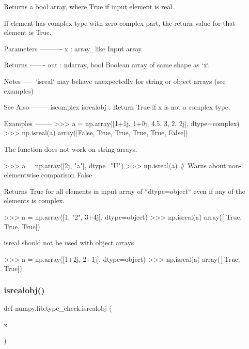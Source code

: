 \begin{DoxyVerb}Returns a bool array, where True if input element is real.

If element has complex type with zero complex part, the return value
for that element is True.

Parameters
----------
x : array_like
    Input array.

Returns
-------
out : ndarray, bool
    Boolean array of same shape as `x`.

Notes
-----
`isreal` may behave unexpectedly for string or object arrays (see examples)

See Also
--------
iscomplex
isrealobj : Return True if x is not a complex type.

Examples
--------
>>> a = np.array([1+1j, 1+0j, 4.5, 3, 2, 2j], dtype=complex)
>>> np.isreal(a)
array([False,  True,  True,  True,  True, False])

The function does not work on string arrays.

>>> a = np.array([2j, "a"], dtype="U")
>>> np.isreal(a)  # Warns about non-elementwise comparison
False

Returns True for all elements in input array of ``dtype=object`` even if
any of the elements is complex.

>>> a = np.array([1, "2", 3+4j], dtype=object)
>>> np.isreal(a)
array([ True,  True,  True])

isreal should not be used with object arrays

>>> a = np.array([1+2j, 2+1j], dtype=object)
>>> np.isreal(a)
array([ True,  True])\end{DoxyVerb}
 \mbox{\label{namespacenumpy_1_1lib_1_1type__check_a243f51ea0c073459dfef76f57affe775}} 
\subsubsection{\texorpdfstring{isrealobj()}{isrealobj()}}
{\footnotesize\ttfamily def numpy.\+lib.\+type\+\_\+check.\+isrealobj (\begin{DoxyParamCaption}\item[{}]{x }\end{DoxyParamCaption})}

